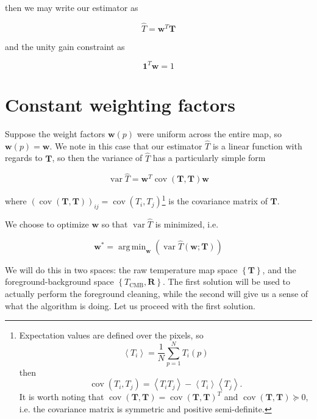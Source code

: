 \documentclass[twoside,10pt]{article}
\DeclareMathOperator{\vvar}{var}
\DeclareMathOperator{\cvar}{cov}
\DeclareMathOperator*{\argmin}{arg\,min}
\newcommand{\ve}[1]{\mathbf{#1}}
\newcommand{\Avg}[1]{\left< #1 \right>}
\newcommand{\pc}[1]{\left\{ #1 \right\} }
\newcommand{\Tcmb}[0]{T_\mathrm{CMB}}
\newcommand{\hT}[0]{\hat{T}}
\newcommand{\cov}[1]{\cvar{\left(#1\right)}}
\newcommand{\varhT}[0]{\vvar{\hat{T}}}
\newcommand{\vw}[0]{\ve{w}}
\newcommand{\vT}[0]{\ve{T}}
\begin{document}
then we may write our estimator as

\begin{equation}
    \hT = \vw^T \vT
\end{equation}

and the unity gain constraint as

\begin{equation}
    \ve{1}^T \vw = 1
\end{equation}

\section{Constant weighting factors}
\label{sec:constant_weighting_factors}

Suppose the weight factors $\vw(p)$ were uniform across the entire map, so
$\vw(p) = \vw$. We note in this case that our estimator $\hT$ is a
linear function with regards to $\vT$, so then the variance of $\hT$ has a
particularly simple form

\begin{equation}
    \varhT = \vw^T \cov{\vT, \vT} \vw
\end{equation}

where $\left(\cov{\vT, \vT}\right)_{ij} = \cov{T_i, T_j}$\footnote{
Expectation values are defined over the pixels, so
\begin{equation*}
    \Avg{T_i} = \frac{1}{N} \sum_{p=1}^N T_i(p)
\end{equation*}
then
\begin{equation*}
    \cov{T_i, T_j} = \Avg{T_i T_j} - \Avg{T_i}\Avg{T_j}.
\end{equation*}
It is worth noting that $\cov{\vT, \vT} = \cov{\vT, \vT}^T$ and
$\cov{\vT, \vT} \succeq 0$, i.e. the covariance matrix is symmetric and
positive semi-definite.} is the covariance matrix of $\vT$.

We choose to optimize $\vw$ so that $\varhT$ is minimized, i.e.

\begin{equation}
    \vw^* = \argmin_{\vw} \left( \varhT(\vw; \vT) \right)
\end{equation}

We will do this in two spaces: the raw temperature map space $\pc{\vT}$, and
the foreground-background space $\pc{\Tcmb, \ve{R}}$. The first solution will
be used to actually perform the foreground cleaning, while the second will
give us a sense of what the algorithm is doing. Let us proceed with the first
solution.
\end{document}
